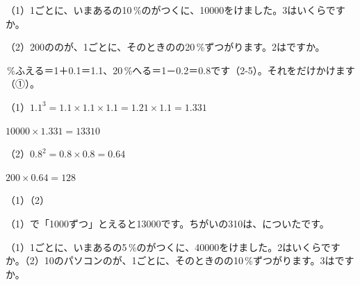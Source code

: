 \begin{reidai}[\R{割合}{わり|あい}でふえる・へる]
（1）1ごとに、いまあるの10\,\%のがつくに、10000をけました。3はいくらですか。\par
（2）200ののが、1ごとに、そのときのの20\,\%ずつがります。2はですか。\par
{}\,\%ふえる＝1＋0.1＝1.1、20\,\%へる＝1－0.2＝0.8です（2-5）。それをだけかけます（①）。\par
\shiki（1）\nobreak $1.1^3=1.1\times1.1\times1.1=1.21\times1.1=1.331$\par
\hspace*{2.6\zw}$10000\times1.331=13310$\par
\hspace*{2.6\zw}（2）\nobreak $0.8^2=0.8\times0.8=0.64$\par
\hspace*{2.6\zw}$200\times0.64=128$\par
\kotae（1）\quad（2）
\end{reidai}
\noindent（1）で「1000ずつ」とえると13000です。ちがいの310は、についたです。

\begin{jibun}
（1）1ごとに、いまあるの5\,\%のがつくに、40000をけました。2はいくらですか。（2）10のパソコンのが、1ごとに、そのときのの10\,\%ずつがります。3はですか。
\end{jibun}

